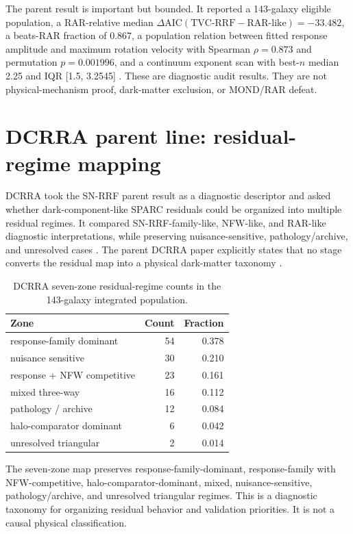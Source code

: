 \documentclass[11pt]{article}
\begin{document}
The parent result is important but bounded. It reported a 143-galaxy eligible population, a RAR-relative median $\Delta\mathrm{AIC}(\mathrm{TVC\mbox{-}RRF}-\mathrm{RAR\mbox{-}like})=-33.482$, a beats-RAR fraction of 0.867, a population relation between fitted response amplitude and maximum rotation velocity with Spearman $\rho=0.873$ and permutation $p=0.001996$, and a continuum exponent scan with best-$n$ median 2.25 and IQR [1.5, 3.2545] \cite{yoshimura_snrrf}. These are diagnostic audit results. They are not physical-mechanism proof, dark-matter exclusion, or MOND/RAR defeat.

\section{DCRRA parent line: residual-regime mapping}
DCRRA took the SN-RRF parent result as a diagnostic descriptor and asked whether dark-component-like SPARC residuals could be organized into multiple residual regimes. It compared SN-RRF-family-like, NFW-like, and RAR-like diagnostic interpretations, while preserving nuisance-sensitive, pathology/archive, and unresolved cases \cite{yoshimura_dcrra}. The parent DCRRA paper explicitly states that no stage converts the residual map into a physical dark-matter taxonomy \cite{yoshimura_dcrra}.

\begin{table}[H]
\centering
\caption{DCRRA seven-zone residual-regime counts in the 143-galaxy integrated population.}
\begin{tabular}{lrr}
\toprule
Zone & Count & Fraction \\
\midrule
response-family
dominant & 54 & 0.378 \\
nuisance
sensitive & 30 & 0.210 \\
response + NFW
competitive & 23 & 0.161 \\
mixed
three-way & 16 & 0.112 \\
pathology /
archive & 12 & 0.084 \\
halo-comparator
dominant & 6 & 0.042 \\
unresolved
triangular & 2 & 0.014 \\
\bottomrule
\end{tabular}
\end{table}

The seven-zone map preserves response-family-dominant, response-family with NFW-competitive, halo-comparator-dominant, mixed, nuisance-sensitive, pathology/archive, and unresolved triangular regimes. This is a diagnostic taxonomy for organizing residual behavior and validation priorities. It is not a causal physical classification.
\end{document}
